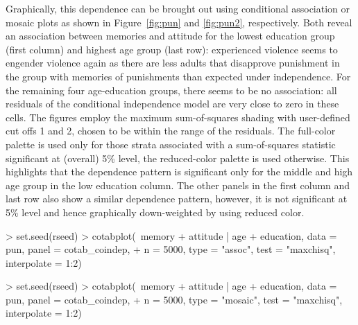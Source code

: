 \documentclass{Z}
\begin{document}
Graphically, this dependence can be brought out using conditional association
or mosaic plots as shown in Figure~\ref{fig:pun} and \ref{fig:pun2}, respectively.
Both reveal an association between memories and attitude
for the lowest education group (first column) and highest age group (last row):
experienced violence seems to engender violence again as there are less adults
that disapprove punishment in the group with memories of punishments than expected
under independence. For the remaining four age-education groups, there seems to be
no association: all residuals of the conditional independence model are very close to
zero in these cells. The figures employ the maximum sum-of-squares shading
with user-defined cut offs 1 and 2, chosen to be within the range of the residuals.
The full-color palette is used only for those strata associated with a
sum-of-squares statistic significant at (overall) 5\% level, the reduced-color
palette is used otherwise. This highlights that the dependence pattern is significant
only for the middle and high age group in the low education column. The other panels
in the first column and last row also show a similar dependence pattern, however, it is not
significant at 5\% level and hence graphically down-weighted by using reduced color.

\begin{Schunk}
\begin{Sinput}
> set.seed(rseed)
> cotabplot(~memory + attitude | age + education, data = pun, panel = cotab_coindep, 
+     n = 5000, type = "assoc", test = "maxchisq", interpolate = 1:2)
\end{Sinput}
\end{Schunk}
\begin{Schunk}
\begin{Sinput}
> set.seed(rseed)
> cotabplot(~memory + attitude | age + education, data = pun, panel = cotab_coindep, 
+     n = 5000, type = "mosaic", test = "maxchisq", interpolate = 1:2)
\end{Sinput}
\end{Schunk}



\end{document}
